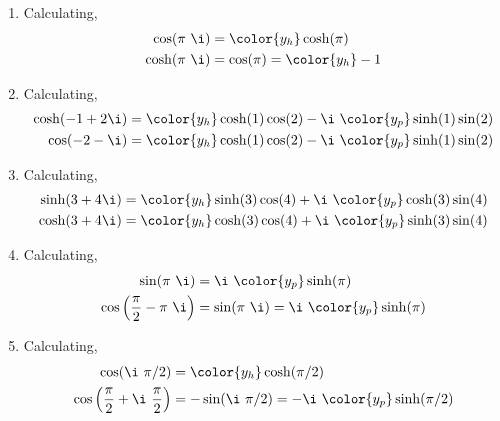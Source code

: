 \begin{enumerate}
    \item Calculating,
          \begin{align}
              \cos(\pi\ \i)  & = \color{y_h} \cosh(\pi)     \\
              \cosh(\pi\ \i) & = \cos(\pi) = \color{y_h} -1
          \end{align}

    \item Calculating,
          \begin{align}
              \cosh(-1 + 2\i) & = {\color{y_h} \cosh(1) \cos(2)}
              - \i\ \color{y_p} \sinh(1)\sin(2)                  \\
              \cos(-2 - \i)   & = {\color{y_h} \cosh(1) \cos(2)}
              - \i\ \color{y_p} \sinh(1)\sin(2)
          \end{align}

    \item Calculating,
          \begin{align}
              \sinh(3 + 4\i) & = {\color{y_h} \sinh(3) \cos(4)}
              + \i\ \color{y_p} \cosh(3)\sin(4)                 \\
              \cosh(3 + 4\i) & = {\color{y_h} \cosh(3) \cos(4)}
              + \i\ \color{y_p} \sinh(3)\sin(4)
          \end{align}

    \item Calculating,
          \begin{align}
              \sin(\pi\ \i)                          & = \i\ \color{y_p} \sinh(\pi) \\
              \cos\Big(\frac{\pi}{2} - \pi\ \i \Big) & = \sin(\pi\ \i)
              = \i\ \color{y_p} \sinh(\pi)
          \end{align}

    \item Calculating,
          \begin{align}
              \cos(\i\ \pi/2)                                  & = \color{y_h}
              \cosh(\pi/2)                                                          \\
              \cos\Big(\frac{\pi}{2} + \i\ \frac{\pi}{2} \Big) & = -\sin(\i\ \pi/2)
              = -\i\ \color{y_p} \sinh(\pi/2)
          \end{align}


\end{enumerate}
